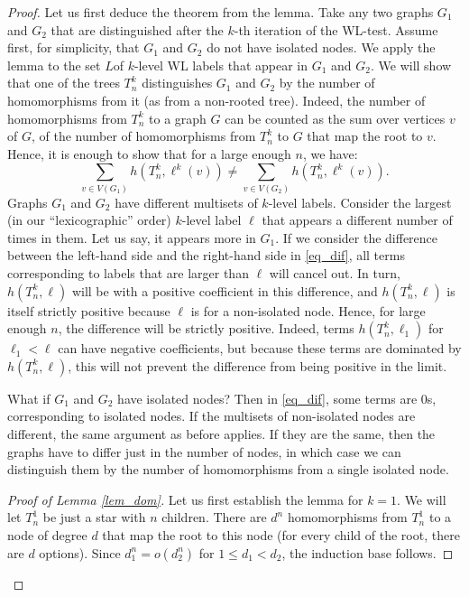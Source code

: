 \documentclass[10pt,a4paper]{amsart}
\begin{document}
\begin{proof}
    
    Let us first deduce the theorem from the lemma. Take any two graphs $G_1$ and $G_2$ that are distinguished after the $k$-th iteration of the WL-test.  Assume first, for simplicity, that $G_1$ and $G_2$ do not have isolated nodes.
    We apply the lemma to the set $L$of $k$-level WL labels that appear in $G_1$ and $G_2$. We will show that one of the trees $T^k_n$ distinguishes $G_1$ and $G_2$ by the number of homomorphisms from it (as from a non-rooted tree). Indeed, the number of homomorphisms from $T^k_n$ to a graph $G$ can be counted as the sum over vertices $v$ of $G$, of the number of homomorphisms from $T^k_n$ to $G$ that map the root to $v$. Hence, it is enough to show that for a large enough $n$, we have:
    \begin{equation}
    \label{eq_dif}
    \sum\limits_{v\in V(G_1)} h(T^k_n,\ell^k(v)) \neq \sum\limits_{v\in V(G_2)} h(T^k_n,\ell^k(v)). 
    \end{equation}
    Graphs $G_1$ and $G_2$ have different multisets of $k$-level labels. Consider the largest (in our ``lexicographic'' order) $k$-level label $\ell$ that appears a different number of times in them. Let us say, it appears more in $G_1$. If we consider the difference between the left-hand side and the right-hand side in \eqref{eq_dif}, all terms corresponding to labels that are larger than $\ell$ will cancel out. In turn, $h(T_n^k, \ell)$ will be with a positive coefficient in this difference, and $h(T_n^k,\ell)$ is itself strictly positive because $\ell$ is for a non-isolated node. Hence, for large enough $n$, the difference will be strictly positive. Indeed, terms $h(T_n^k, \ell_1)$ for $\ell_1 < \ell$ can have negative coefficients, but because these terms are dominated by  $h(T_n^k, \ell)$, this will not prevent the difference from being positive in the limit.

    What if $G_1$ and $G_2$ have isolated nodes? Then in \eqref{eq_dif}, some terms are 0s, corresponding to isolated nodes. If the multisets of non-isolated nodes are different, the same argument as before applies. If they are the same, then the graphs have to differ just in the number of nodes, in which case we can distinguish them by the number of homomorphisms from a single isolated node.


    \begin{proof}[Proof of Lemma \ref{lem_dom}]
        Let us first establish the lemma for $k = 1$. We will let $T^1_n$ be just a star with $n$ children. There are $d^n$ homomorphisms from $T^1_n$ to a node of degree $d$ that map the root to this node (for every child of the root, there are $d$ options). Since $d_1^n = o(d_2^n)$ for $1\le d_1 < d_2$, the induction base follows.


\end{proof}
\end{proof}
\end{document}
